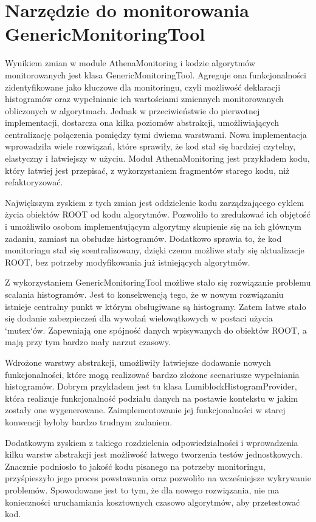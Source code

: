\section{Narzędzie do monitorowania GenericMonitoringTool} \label{generic-monitoring-tool-description}
Wynikiem zmian w module AthenaMonitoring i kodzie algorytmów monitorowanych jest klasa GenericMonitoringTool.
Agreguje ona funkcjonalności zidentyfikowane jako kluczowe dla monitoringu, czyli możliwość deklaracji histogramów oraz wypełnianie ich wartościami zmiennych monitorowanych obliczonych w algorytmach.
Jednak w przeciwieństwie do pierwotnej implementacji, dostarcza ona kilka poziomów abstrakcji, umożliwiających centralizację połączenia pomiędzy tymi dwiema warstwami.
Nowa implementacja wprowadziła wiele rozwiązań, które sprawiły, że kod stał się bardziej czytelny, elastyczny i łatwiejszy w użyciu.
Moduł AthenaMonitoring jest przykładem kodu, który łatwiej jest przepisać, z wykorzystaniem fragmentów starego kodu, niż refaktoryzować. 

Największym zyskiem z tych zmian jest oddzielenie kodu zarządzającego cyklem życia obiektów ROOT od kodu algorytmów. 
Pozwoliło to zredukować ich objętość i umożliwiło osobom implementującym algorytmy skupienie się na ich głównym zadaniu, zamiast na obsłudze histogramów.
Dodatkowo sprawia to, że kod monitoringu stał się scentralizowany, dzięki czemu możliwe stały się aktualizacje ROOT, bez potrzeby modyfikowania już istniejących algorytmów.

Z wykorzystaniem GenericMonitoringTool możliwe stało się rozwiązanie problemu scalania histogramów.
Jest to konsekwencją tego, że w nowym rozwiązaniu istnieje centralny punkt w którym obsługiwane są histogramy.
Zatem łatwe stało się dodanie zabezpieczeń dla wywołań wielowątkowych w postaci użycia `mutex`ów.
Zapewniają one spójność danych wpisywanych do obiektów ROOT, a mają przy tym bardzo mały narzut czasowy.

Wdrożone warstwy abstrakcji, umożliwiły łatwiejsze dodawanie nowych funkcjonalności, które mogą realizować bardzo złożone scenariusze wypełniania histogramów.
Dobrym przykładem jest tu klasa LumiblockHistogramProvider, która realizuje funkcjonalność podziału danych na postawie kontekstu w jakim zostały one wygenerowane. 
Zaimplementowanie jej funkcjonalności w starej konwencji byłoby bardzo trudnym zadaniem. 

Dodatkowym zyskiem z takiego rozdzielenia odpowiedzialności i wprowadzenia kilku warstw abstrakcji jest możliwość łatwego tworzenia testów jednostkowych. 
Znacznie podniosło to jakość kodu pisanego na potrzeby monitoringu, przyśpieszyło jego proces powstawania oraz pozwoliło na wcześniejsze wykrywanie problemów.
Spowodowane jest to tym, że dla nowego rozwiązania, nie ma konieczności uruchamiania kosztownych czasowo algorytmów, aby przetestować kod.

